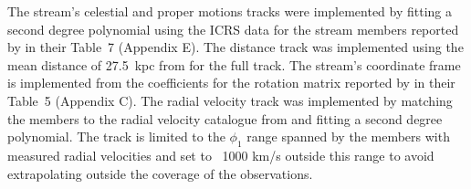 The stream's celestial and proper motions tracks were implemented by fitting a second degree polynomial using the ICRS data for the stream members reported by \citet{Shipp2019} in their Table~7 (Appendix E). The distance track was implemented using the mean distance of 27.5~kpc from \citet{Shipp2018} for the full track. The stream's coordinate frame is implemented from the coefficients for the rotation matrix reported by \citet{Shipp2019} in their Table~5 (Appendix C). The radial velocity track was implemented by matching the \citet{Shipp2019} members to the radial velocity catalogue from \citet{Li2022} and fitting a second degree polynomial. The track is limited to the $\phi_1$ range spanned by the members with measured radial velocities and set to ~1000 km/s outside this range to avoid extrapolating outside the coverage of the observations.
